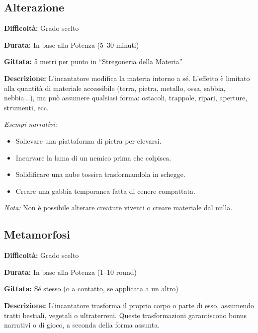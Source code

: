 \documentclass[./magie.tex]{subfiles}
\begin{document}
\subsection*{Alterazione}
\begin{description}
\item \textbf{Difficoltà:} Grado scelto
\item \textbf{Durata:} In base alla Potenza (5–30 minuti)
\item \textbf{Gittata:} 5 metri per punto in “Stregoneria della Materia”
\item \textbf{Descrizione:} L’incantatore modifica la materia intorno a sé. L’effetto è limitato alla quantità di materiale accessibile (terra, pietra, metallo, ossa, sabbia, nebbia...), ma può assumere qualsiasi forma: ostacoli, trappole, ripari, aperture, strumenti, ecc.
\end{description}

\textit{Esempi narrativi:}
\begin{itemize}
\item Sollevare una piattaforma di pietra per elevarsi.
\item Incurvare la lama di un nemico prima che colpisca.
\item Solidificare una nube tossica trasformandola in schegge.
\item Creare una gabbia temporanea fatta di cenere compattata.
\end{itemize}

\textit{Nota:} Non è possibile alterare creature viventi o creare materiale dal nulla.

\clearpage
\subsection*{Metamorfosi}
\begin{description}
\item \textbf{Difficoltà:} Grado scelto
\item \textbf{Durata:} In base alla Potenza (1–10 round)
\item \textbf{Gittata:} Sé stesso (o a contatto, se applicata a un altro)
\item \textbf{Descrizione:} L’incantatore trasforma il proprio corpo o parte di esso, assumendo tratti bestiali, vegetali o ultraterreni. Queste trasformazioni garantiscono bonus narrativi o di gioco, a seconda della forma assunta.
\end{description}
\end{document}

